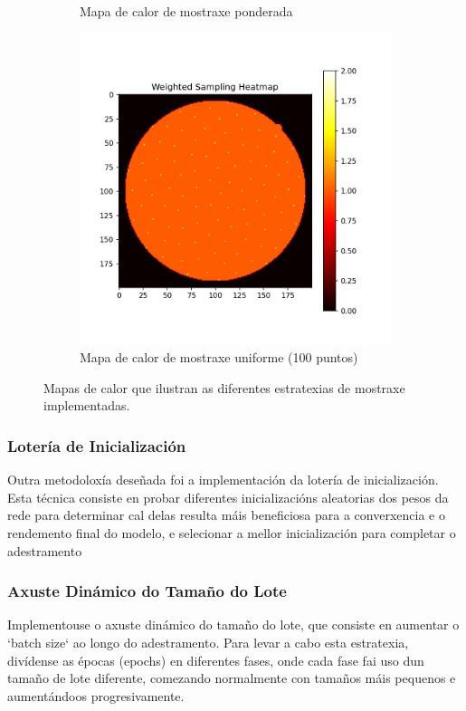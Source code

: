 \begin{figure}[tbp]
\begin{subfigure}[b]{0.3\textwidth}
        \caption{Mapa de calor de mostraxe ponderada}
        \label{fig:weighted_sampling_heatmap}
    \end{subfigure}
    \hfill
    \begin{subfigure}[b]{0.3\textwidth}
        \centering
        \includegraphics[width=\textwidth]{imaxes/muestraje/uniform_sampling_heatmap.png}
        \caption{Mapa de calor de mostraxe uniforme (100 puntos)}
        \label{fig:uniform_sampling_heatmap}
    \end{subfigure}
    \caption{Mapas de calor que ilustran as diferentes estratexias de mostraxe implementadas.}
    \label{fig:sampling_heatmaps}
\end{figure}

\subsubsection{Lotería de Inicialización}
\label{subsubsec:loteria_inicializacion}
Outra metodoloxía deseñada foi a implementación da lotería de inicialización. Esta técnica consiste en probar diferentes inicializacións aleatorias dos pesos da rede para determinar cal delas resulta máis beneficiosa para a converxencia e o rendemento final do modelo, e selecionar a mellor inicialización para completar o adestramento

\subsubsection{Axuste Dinámico do Tamaño do Lote}
\label{subsubsec:axuste_dinamico_batch_size}
Implementouse o axuste dinámico do tamaño do lote, que consiste en aumentar o `batch size` ao longo do adestramento. Para levar a cabo esta estratexia, divídense as épocas (epochs) en diferentes fases, onde cada fase fai uso dun tamaño de lote diferente, comezando normalmente con tamaños máis pequenos e aumentándoos progresivamente.



